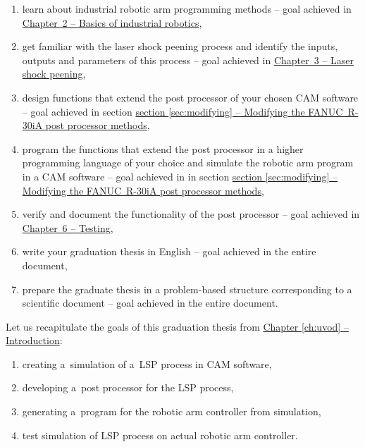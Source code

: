 \begin{enumerate}

    \item learn about industrial robotic arm programming methods -- goal achieved in  \hyperref[chap:basics]{Chapter~2 -- Basics of industrial robotics},
    
    
    \item get familiar with the laser shock peening process and identify the inputs, outputs and parameters of this process -- goal achieved in \hyperref[chap:peening]{Chapter~3 -- Laser shock peening},
    
    
    \item design functions that extend the post processor of your chosen CAM software -- goal achieved in section \hyperref[sec:modifying]{section \ref{sec:modifying} -- Modifying the FANUC~R-30iA post processor methods},
    
    
    \item program the functions that extend the post processor in a higher programming language of your choice and simulate the robotic arm program in a CAM software -- goal achieved in in section \hyperref[sec:modifying]{section \ref{sec:modifying} -- Modifying the FANUC~R-30iA post processor methods},
    
    
    \item verify and document the functionality of the post processor -- goal achieved in \hyperref[chap:testing]{Chapter~6 -- Testing},
    
    
    \item write your graduation thesis in English -- goal achieved in the entire document,
    
    
    \item prepare the graduate thesis in a problem-based structure corresponding to a scientific document -- goal achieved in the entire document.
    
\end{enumerate}

Let us recapitulate the goals of this graduation thesis from \hyperref[ch:uvod]{Chapter \ref{ch:uvod} -- Introduction}:

\begin{enumerate}

    \item creating a~simulation of a~LSP process in CAM software,
    \item developing a~post processor for the LSP process, 
    \item generating a~program  for the robotic arm controller from simulation,
    \item test simulation of LSP process on actual robotic arm controller.
    
\end{enumerate}

